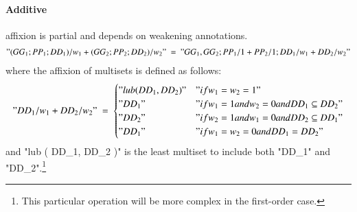 \documentclass{article}
\begin{document}
\paragraph{Additive}
\label{sec:additive}


affixion is partial and depends on weakening annotations.
\begin{gather*}
  "( GG_1 ; PP_1 ; DD_1 ) / w_1 + ( GG_2 ; PP_2 ; DD_2 ) / w_2"\ =\
  "GG_1, GG_2 ; PP_1 / 1 + PP_2 / 1 ; DD_1 / w_1 + DD_2 / w_2"
\end{gather*}
where the affixion of multisets is defined as follows:
\begin{gather*}
  "DD_1 / w_1 + DD_2 / w_2"\ = \
  \begin{cases}
    "lub ( DD_1, DD_2 )" & "{{if }} w_1 = w_2 = 1" \\
    "DD_1" & "{{if }} w_1 = 1 and w_2 = 0 and DD_1 \subseteq DD_2" \\
    "DD_2" & "{{if }} w_2 = 1 and w_1 = 0 and DD_2 \subseteq DD_1" \\
    "DD_1" & "{{if }} w_1 = w_2 = 0 and DD_1 = DD_2"
  \end{cases}
\end{gather*}
and "lub ( DD_1, DD_2 )" is the least multiset to include both "DD_1"
and "DD_2".\footnote{This particular operation will be more complex in
  the first-order case.}
\end{document}
